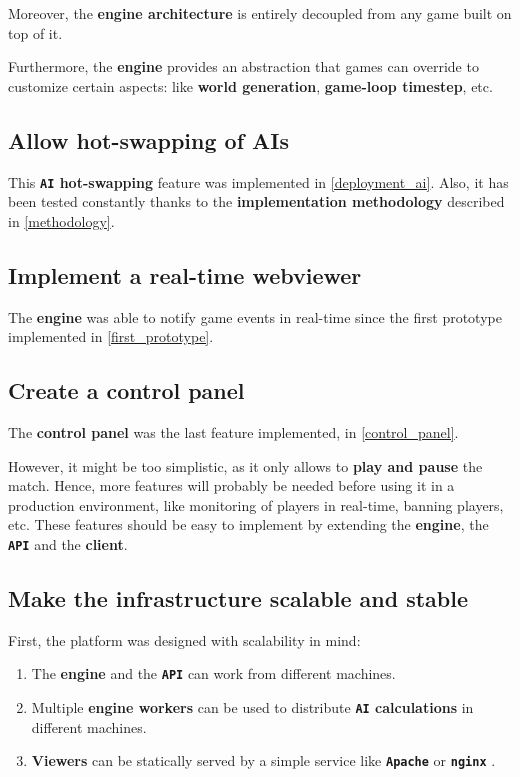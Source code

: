 \documentclass[a4paper,11pt,titlepage,abstract,numbers=noenddot,automark,mnsy,intlimits,rgb,dvipsnames]{report}
\begin{document}
Moreover, the \textbf{engine architecture} is entirely decoupled from any game built on
top of it.

Furthermore, the \textbf{engine} provides an abstraction that games can override to customize certain aspects:
like \textbf{world generation}, \textbf{game-loop timestep}, etc.
\subsection{Allow hot-swapping of AIs}
This \textbf{\texttt{AI} hot-swapping} feature was implemented in \autoref{deployment_ai}. Also, it has been tested constantly
thanks to the \textbf{implementation methodology} described in \autoref{methodology}.
\subsection{Implement a real-time webviewer}
The \textbf{engine} was able to notify game events in real-time since the first prototype implemented in
\autoref{first_prototype}.
\subsection{Create a control panel}
The \textbf{control panel} was the last feature implemented, in \autoref{control_panel}.

However, it might be too simplistic, as it only allows to \textbf{play and pause} the match.
Hence, more features will probably be needed before using it in a production environment, like
monitoring of players in real-time, banning players, etc. These features should be easy to implement by
extending the \textbf{engine}, the \textbf{\texttt{API}} and the \textbf{client}.
\subsection{Make the infrastructure scalable and stable}
First, the platform was designed with scalability in mind:
\begin{enumerate}
\item
The \textbf{engine} and the \textbf{\texttt{API}} can work from different machines.
\item
Multiple \textbf{engine workers} can be used to distribute \textbf{\texttt{AI} calculations} in different machines.
\item
\textbf{Viewers} can be statically served by a simple service like \textbf{\texttt{Apache}} \cite{apache} or \textbf{\texttt{nginx}} \cite{nginx}.
\end{enumerate}
\end{document}
